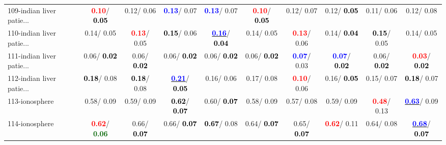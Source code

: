 \begin{table}[h]
\begin{center}
{\begin{tabular}{lc|c|c|c|c|c|c|c|c}
109-indian liver patie... & \textcolor{red}{\textbf{  0.10}}/\textcolor{black}{\textbf{  0.05}} &   0.12/  0.06 & \textcolor{blue}{\textbf{  0.13}}/  0.07 & \textcolor{blue}{\textbf{  0.13}}/  0.07 & \textcolor{red}{\textbf{  0.10}}/\textcolor{black}{\textbf{  0.05}} &   0.12/  0.07 &   0.12/\textcolor{black}{\textbf{  0.05}} &   0.11/  0.06 &   0.12/  0.08 \\
110-indian liver patie... &   0.14/  0.05 & \textcolor{red}{\textbf{  0.13}}/  0.05 & \textcolor{black}{\textbf{  0.15}}/  0.06 & \underline{\textcolor{blue}{\textbf{  0.16}}}/\textcolor{black}{\textbf{  0.04}} &   0.14/  0.05 & \textcolor{red}{\textbf{  0.13}}/  0.06 &   0.14/\textcolor{black}{\textbf{  0.04}} & \textcolor{black}{\textbf{  0.15}}/  0.05 &   0.14/  0.05 \\ \hline
111-indian liver patie... &   0.06/\textcolor{black}{\textbf{  0.02}} &   0.06/\textcolor{black}{\textbf{  0.02}} &   0.06/\textcolor{black}{\textbf{  0.02}} &   0.06/\textcolor{black}{\textbf{  0.02}} &   0.06/\textcolor{black}{\textbf{  0.02}} & \textcolor{blue}{\textbf{  0.07}}/  0.03 & \textcolor{blue}{\textbf{  0.07}}/\textcolor{black}{\textbf{  0.02}} &   0.06/\textcolor{black}{\textbf{  0.02}} & \textcolor{red}{\textbf{  0.03}}/\textcolor{black}{\textbf{  0.02}} \\
112-indian liver patie... & \textcolor{black}{\textbf{  0.18}}/  0.08 & \textcolor{black}{\textbf{  0.18}}/  0.08 & \underline{\textcolor{blue}{\textbf{  0.21}}}/\textcolor{black}{\textbf{  0.05}} &   0.16/  0.06 &   0.17/  0.08 & \textcolor{red}{\textbf{  0.10}}/  0.06 &   0.16/\textcolor{black}{\textbf{  0.05}} &   0.15/  0.07 & \textcolor{black}{\textbf{  0.18}}/  0.07 \\
113-ionosphere &   0.58/  0.09 &   0.59/  0.09 & \textcolor{black}{\textbf{  0.62}}/\textcolor{black}{\textbf{  0.07}} &   0.60/\textcolor{black}{\textbf{  0.07}} &   0.58/  0.09 &   0.57/  0.08 &   0.59/  0.09 & \textcolor{red}{\textbf{  0.48}}/  0.13 & \underline{\textcolor{blue}{\textbf{  0.63}}}/  0.09 \\
114-ionosphere & \textcolor{red}{\textbf{  0.62}}/\textcolor{darkgreen}{\textbf{  0.06}} &   0.66/\textcolor{black}{\textbf{  0.07}} &   0.66/\textcolor{black}{\textbf{  0.07}} & \textcolor{black}{\textbf{  0.67}}/  0.08 &   0.64/\textcolor{black}{\textbf{  0.07}} &   0.65/\textcolor{black}{\textbf{  0.07}} & \textcolor{red}{\textbf{  0.62}}/  0.11 &   0.64/  0.08 & \underline{\textcolor{blue}{\textbf{  0.68}}}/\textcolor{black}{\textbf{  0.07}} \\

\end{tabular}}
\end{center}
\end{table}
